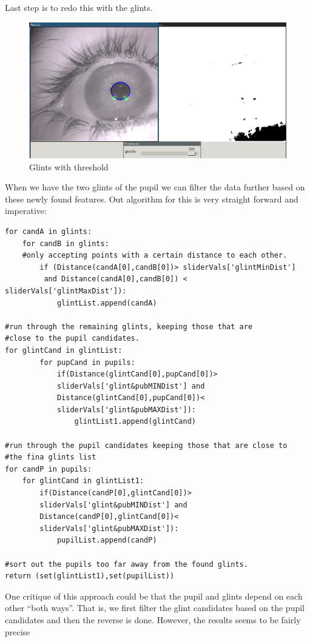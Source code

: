 Last step is to redo this with the glints.

\begin{figure}[htbp]
\centering
\includegraphics{pics/glintsthr.png}
\caption{Glints with threshold \label{glintsthr}}
\end{figure}

When we have the two glints of the pupil we can filter the data further
based on these newly found features. Out algorithm for this is very
straight forward and imperative:

\begin{verbatim}
for candA in glints:
    for candB in glints:
    #only accepting points with a certain distance to each other.
        if (Distance(candA[0],candB[0])> sliderVals['glintMinDist']
         and Distance(candA[0],candB[0]) < sliderVals['glintMaxDist']):
            glintList.append(candA)

#run through the remaining glints, keeping those that are 
#close to the pupil candidates.
for glintCand in glintList:
        for pupCand in pupils:
            if(Distance(glintCand[0],pupCand[0])>
            sliderVals['glint&pubMINDist'] and 
            Distance(glintCand[0],pupCand[0])<
            sliderVals['glint&pubMAXDist']):
                glintList1.append(glintCand)

#run through the pupil candidates keeping those that are close to 
#the fina glints list
for candP in pupils:
    for glintCand in glintList1:
        if(Distance(candP[0],glintCand[0])>
        sliderVals['glint&pubMINDist'] and 
        Distance(candP[0],glintCand[0])<
        sliderVals['glint&pubMAXDist']):
            pupilList.append(candP)

#sort out the pupils too far away from the found glints.
return (set(glintList1),set(pupilList))
\end{verbatim}
One critique of this approach could be that the pupil and glints depend
on each other ``both ways''. That is, we first filter the glint
candidates based on the pupil candidates and then the reverse is done.
However, the results seems to be fairly precise

